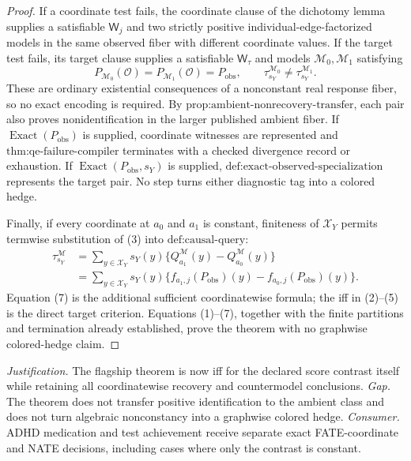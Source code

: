 \documentclass{article}
\begin{document}
\begin{proof}
If a coordinate test fails, the coordinate clause of the dichotomy lemma supplies a satisfiable \(\mathsf W_j\) and two strictly positive individual-edge-factorized models in the same observed fiber with different coordinate values.  If the target test fails, its target clause supplies a satisfiable \(\mathsf W_\tau\) and models \(\mathcal M_0,\mathcal M_1\) satisfying
\[
P_{\mathcal M_0}(\mathcal O)=P_{\mathcal M_1}(\mathcal O)=P_{\mathrm{obs}},
\qquad
\tau_{s_Y}^{\mathcal M_0}\neq\tau_{s_Y}^{\mathcal M_1}.
\tag{6}
\]
These are ordinary existential consequences of a nonconstant real response fiber, so no exact encoding is required.  By \(\text{prop:ambient-nonrecovery-transfer}\), each pair also proves nonidentification in the larger published ambient fiber.  If \(\operatorname{Exact}(P_{\mathrm{obs}})\) is supplied, coordinate witnesses are represented and \(\text{thm:qe-failure-compiler}\) terminates with a checked divergence record or exhaustion.  If \(\operatorname{Exact}(P_{\mathrm{obs}},s_Y)\) is supplied, \(\text{def:exact-observed-specialization}\) represents the target pair.  No step turns either diagnostic tag into a colored hedge.

Finally, if every coordinate at \(a_0\) and \(a_1\) is constant, finiteness of \(\mathcal X_Y\) permits termwise substitution of (3) into \(\text{def:causal-query}\):
\[
\begin{aligned}
\tau_{s_Y}^{\mathcal M}
&=\sum_{y\in\mathcal X_Y}s_Y(y)
\{Q_{a_1}^{\mathcal M}(y)-Q_{a_0}^{\mathcal M}(y)\}\\
&=\sum_{y\in\mathcal X_Y}s_Y(y)
\{f_{a_1,j}(P_{\mathrm{obs}})(y)-f_{a_0,j}(P_{\mathrm{obs}})(y)\}.
\end{aligned}
\tag{7}
\]
Equation (7) is the additional sufficient coordinatewise formula; the iff in (2)--(5) is the direct target criterion.  Equations (1)--(7), together with the finite partitions and termination already established, prove the theorem with no graphwise colored-hedge claim.
\end{proof}
\par\smallskip\noindent \textit{Justification.} The flagship theorem is now iff for the declared score contrast itself while retaining all coordinatewise recovery and countermodel conclusions. \textit{Gap.} The theorem does not transfer positive identification to the ambient class and does not turn algebraic nonconstancy into a graphwise colored hedge. \textit{Consumer.} ADHD medication and test achievement receive separate exact FATE-coordinate and NATE decisions, including cases where only the contrast is constant.
\end{document}
